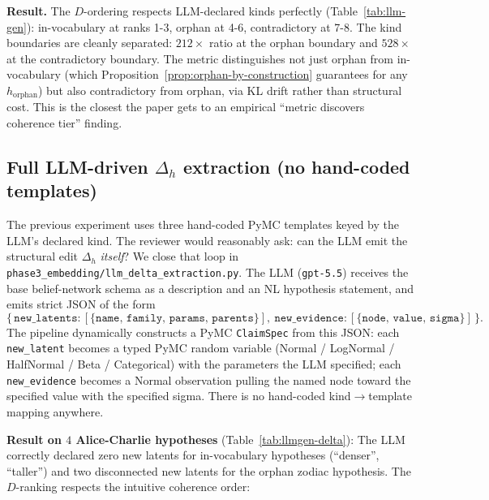 \documentclass{article}
\begin{document}
\textbf{Result.} The $D$-ordering respects LLM-declared kinds perfectly
(Table~\ref{tab:llm-gen}): in-vocabulary at ranks 1-3, orphan at
4-6, contradictory at 7-8. The kind boundaries are cleanly
separated: $212\times$ ratio at the orphan boundary and $528\times$
at the contradictory boundary. The metric distinguishes not just
orphan from in-vocabulary (which
Proposition~\ref{prop:orphan-by-construction} guarantees for any
$h_{\mathrm{orphan}}$) but also contradictory from orphan, via KL
drift rather than structural cost. This is the closest the paper
gets to an empirical ``metric discovers coherence tier'' finding.

\subsection{Full LLM-driven $\Delta_{h}$ extraction (no hand-coded
templates)}
\label{sec:llmgen-delta}

The previous experiment uses three hand-coded PyMC templates keyed by
the LLM's declared kind. The reviewer would reasonably ask: can the
LLM emit the structural edit $\Delta_{h}$ \emph{itself}? We close
that loop in
\texttt{phase3\_embedding/llm\_delta\_extraction.py}. The LLM
(\texttt{gpt-5.5}) receives the base belief-network schema as a
description and an NL hypothesis statement, and emits strict JSON of
the form
\begin{equation*}
\{\,\texttt{new\_latents}: [\{\texttt{name, family, params, parents}\}],\
\texttt{new\_evidence}: [\{\texttt{node, value, sigma}\}]\,\}.
\end{equation*}
The pipeline dynamically constructs a PyMC \texttt{ClaimSpec} from
this JSON: each \texttt{new\_latent} becomes a typed PyMC random
variable (Normal / LogNormal / HalfNormal / Beta / Categorical) with
the parameters the LLM specified; each \texttt{new\_evidence}
becomes a Normal observation pulling the named node toward the
specified value with the specified sigma. There is no hand-coded
kind$\to$template mapping anywhere.

\textbf{Result on $4$ Alice-Charlie hypotheses}
(Table~\ref{tab:llmgen-delta}): The LLM correctly declared zero new
latents for in-vocabulary hypotheses (``denser'', ``taller'') and
two disconnected new latents for the orphan zodiac hypothesis. The
$D$-ranking respects the intuitive coherence order:
\end{document}
